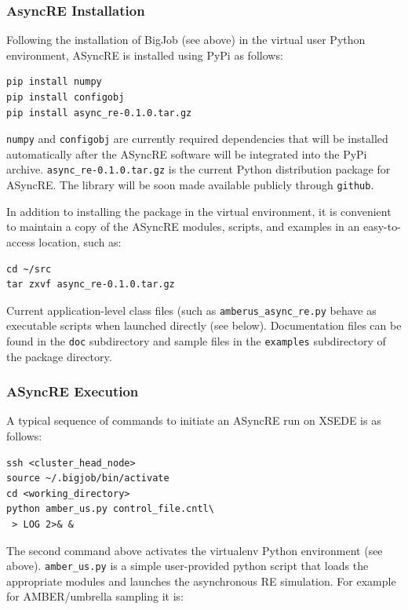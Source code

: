 \documentclass{sig-alternate}
\begin{document}
\subsubsection{AsyncRE Installation}

Following the installation of BigJob (see above) in the virtual user Python environment, ASyncRE is installed using PyPi as follows:

\begin{lstlisting}[frame=single]
pip install numpy
pip install configobj
pip install async_re-0.1.0.tar.gz
\end{lstlisting}

\verb+numpy+ and \verb+configobj+ are currently required dependencies
that will be installed automatically after the ASyncRE software will
be integrated into the PyPi archive. \verb+async_re-0.1.0.tar.gz+ is
the current Python distribution package for ASyncRE. The library will
be soon made available publicly through \verb+github+.

In addition to installing the package in the virtual environment, it
is convenient to maintain a copy of the ASyncRE modules, scripts, and
examples in an easy-to-access location, such as:

\begin{lstlisting}[frame=single]
cd ~/src
tar zxvf async_re-0.1.0.tar.gz
\end{lstlisting}

Current application-level class files (such as
\verb+amberus_async_re.py+ behave as executable scripts when launched
directly (see below). Documentation files can be found in the
\verb+doc+ subdirectory and sample files in the \verb+examples+
subdirectory of the package directory.

\subsubsection{ASyncRE Execution}

A typical sequence of commands to initiate an ASyncRE run on XSEDE is as follows:

\begin{lstlisting}[frame=single]
ssh <cluster_head_node>
source ~/.bigjob/bin/activate
cd <working_directory>
python amber_us.py control_file.cntl\
 > LOG 2>& &
\end{lstlisting}

The second command above activates the virtualenv Python environment (see above). \verb+amber_us.py+ is a simple user-provided python script that loads the appropriate modules and launches the asynchronous RE simulation. For example for AMBER/umbrella sampling it is:
\end{document}
